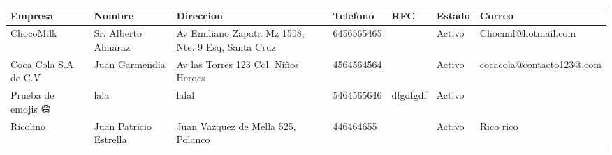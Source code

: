 \documentclass[a4paper,12pt]{article}
\begin{document}
\footnotesize  
\setlength\LTleft{-30pt}
 \setlength\LTright{-100pt}
  \begin{landscape}
 \thispagestyle{empty}
\begin{longtable}{|p{2.5cm}|p{2.5cm}|p{2.5cm}|p{2cm}|p{5cm}|p{1cm}|p{5cm}|}
\hline
\textbf{Empresa} & \textbf{Nombre} & \textbf{Direccion} & \textbf{Telefono} & \textbf{RFC} & \textbf{Estado} & \textbf{Correo}\\ \hline \hline ChocoMilk & Sr. Alberto Almaraz & Av Emiliano Zapata Mz 1558, Nte. 9 Esq, Santa Cruz & 6456565465 &  & Activo & Chocmil@hotmail.com \\ \hline 
Coca Cola S.A de C.V & Juan Garmendia & Av las Torres 123 Col. Niños Heroes & 4564564564 &  & Activo & cocacola@contacto123@.com \\ \hline 
Prueba de emojis 😄️ & lala & lalal & 5464565646 & dfgdfgdf & Activo &  \\ \hline 
Ricolino & Juan Patricio Estrella & Juan Vazquez de Mella 525, Polanco & 446464655 &  & Activo & Rico rico \\ \hline 
\end{longtable}
\thispagestyle{empty}
\end{landscape}
\end{document}
